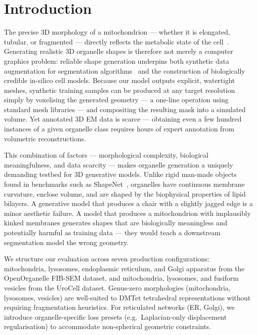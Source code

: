 \documentclass[10pt, a4paper, twocolumn]{article}
\begin{document}
\section{Introduction}
\label{sec:intro}

The precise 3D morphology of a mitochondrion — whether it is elongated, tubular, or fragmented — directly reflects the metabolic state of the cell~\cite{liesa2013mitochondrial}. Generating realistic 3D organelle shapes is therefore not merely a computer graphics problem: reliable shape generation underpins both synthetic data augmentation for segmentation algorithms~\cite{ronneberger2015u} and the construction of biologically credible in-silico cell models. Because our model outputs explicit, watertight meshes, synthetic training samples can be produced at any target resolution simply by voxelising the generated geometry — a one-line operation using standard mesh libraries — and compositing the resulting mask into a simulated volume. Yet annotated 3D EM data is scarce — obtaining even a few hundred instances of a given organelle class requires hours of expert annotation from volumetric reconstructions.

This combination of factors — morphological complexity, biological meaningfulness, and data scarcity — makes organelle generation a uniquely demanding testbed for 3D generative models. Unlike rigid man-made objects found in benchmarks such as ShapeNet~\cite{chang2015shapenet}, organelles have continuous membrane curvature, enclose volume, and are shaped by the biophysical properties of lipid bilayers. A generative model that produces a chair with a slightly jagged edge is a minor aesthetic failure. A model that produces a mitochondrion with implausibly kinked membranes generates shapes that are biologically meaningless and potentially harmful as training data — they would teach a downstream segmentation model the wrong geometry.

We structure our evaluation across seven production configurations: mitochondria, lysosomes, endoplasmic reticulum, and Golgi apparatus from the OpenOrganelle FIB-SEM dataset, and mitochondria, lysosomes, and fusiform vesicles from the UroCell dataset. Genus-zero morphologies (mitochondria, lysosomes, vesicles) are well-suited to DMTet tetrahedral representations without requiring fragmentation heuristics. For reticulated networks (ER, Golgi), we introduce organelle-specific loss presets (e.g.\ Laplacian-only displacement regularisation) to accommodate non-spherical geometric constraints.
\end{document}
